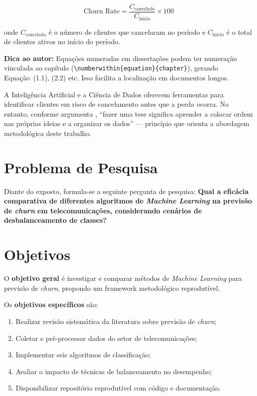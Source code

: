 \documentclass[
    12pt,
    oneside,
    a4paper,
    english,
    brazilian
    ]{abntex2}
\numberwithin{equation}{chapter}
\newenvironment{dica}{%
    \par\medskip
    \color{blue!60!black}\small\itshape
}{%
    \par\medskip
}
\begin{document}
\begin{equation}
    \text{Churn Rate} = \frac{C_{\text{cancelado}}}{C_{\text{início}}} \times 100
    \label{eq:churn_rate_diss}
\end{equation}

\noindent onde $C_{\text{cancelado}}$ é o número de clientes que cancelaram no período e $C_{\text{início}}$ é o total de clientes ativos no início do período.

\begin{dica}
\noindent\textbf{Dica ao autor:} Equações numeradas em dissertações podem ter numeração vinculada ao capítulo (\texttt{\textbackslash numberwithin\{equation\}\{chapter\}}), gerando Equação~(1.1), (2.2) etc. Isso facilita a localização em documentos longos.
\end{dica}

A Inteligência Artificial e a Ciência de Dados oferecem ferramentas para identificar clientes em risco de cancelamento antes que a perda ocorra. No entanto, conforme argumenta , ``fazer uma tese significa aprender a colocar ordem nas próprias ideias e a organizar os dados'' --- princípio que orienta a abordagem metodológica deste trabalho.

\section{Problema de Pesquisa}

Diante do exposto, formula-se a seguinte pergunta de pesquisa: \textbf{Qual a eficácia comparativa de diferentes algoritmos de \textit{Machine Learning} na previsão de \textit{churn} em telecomunicações, considerando cenários de desbalanceamento de classes?}

\section{Objetivos}

O \textbf{objetivo geral} é investigar e comparar métodos de \textit{Machine Learning} para previsão de \textit{churn}, propondo um framework metodológico reprodutível.

Os \textbf{objetivos específicos} são:
\begin{enumerate}
    \item Realizar revisão sistemática da literatura sobre previsão de \textit{churn};
    \item Coletar e pré-processar dados do setor de telecomunicações;
    \item Implementar seis algoritmos de classificação;
    \item Avaliar o impacto de técnicas de balanceamento no desempenho;
    \item Disponibilizar repositório reprodutível com código e documentação.
\end{enumerate}
\end{document}
